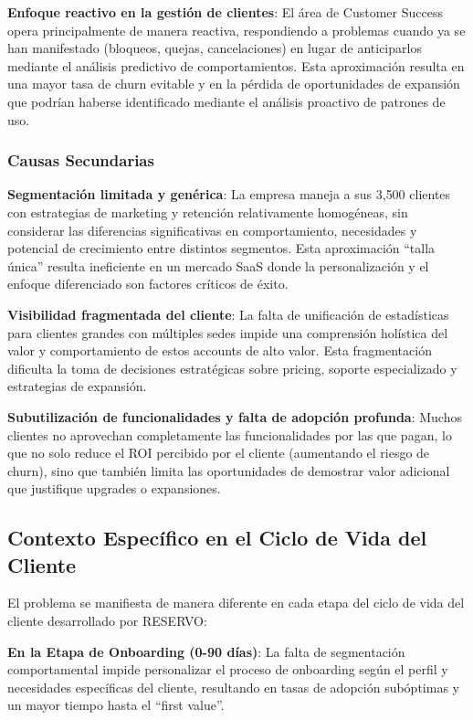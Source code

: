 \textbf{Enfoque reactivo en la gestión de clientes}: El área de Customer Success opera principalmente de manera reactiva, respondiendo a problemas cuando ya se han manifestado (bloqueos, quejas, cancelaciones) en lugar de anticiparlos mediante el análisis predictivo de comportamientos. Esta aproximación resulta en una mayor tasa de churn evitable y en la pérdida de oportunidades de expansión que podrían haberse identificado mediante el análisis proactivo de patrones de uso.

\subsubsection{Causas Secundarias}

\textbf{Segmentación limitada y genérica}: La empresa maneja a sus 3{,}500 clientes con estrategias de marketing y retención relativamente homogéneas, sin considerar las diferencias significativas en comportamiento, necesidades y potencial de crecimiento entre distintos segmentos. Esta aproximación ``talla única'' resulta ineficiente en un mercado SaaS donde la personalización y el enfoque diferenciado son factores críticos de éxito.

\textbf{Visibilidad fragmentada del cliente}: La falta de unificación de estadísticas para clientes grandes con múltiples sedes impide una comprensión holística del valor y comportamiento de estos accounts de alto valor. Esta fragmentación dificulta la toma de decisiones estratégicas sobre pricing, soporte especializado y estrategias de expansión.

\textbf{Subutilización de funcionalidades y falta de adopción profunda}: Muchos clientes no aprovechan completamente las funcionalidades por las que pagan, lo que no solo reduce el ROI percibido por el cliente (aumentando el riesgo de churn), sino que también limita las oportunidades de demostrar valor adicional que justifique upgrades o expansiones.

\subsection{Contexto Específico en el Ciclo de Vida del Cliente}

El problema se manifiesta de manera diferente en cada etapa del ciclo de vida del cliente desarrollado por RESERVO:

\textbf{En la Etapa de Onboarding (0-90 días)}: La falta de segmentación comportamental impide personalizar el proceso de onboarding según el perfil y necesidades específicas del cliente, resultando en tasas de adopción subóptimas y un mayor tiempo hasta el ``first value''.

